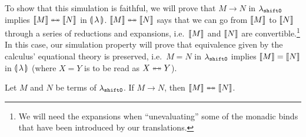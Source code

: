 To show that this simulation is faithful, we will prove that $M \to N$ in
$\lambda_{\shifto}$ implies $\sem{M} \ttoffrom \sem{N}$ in
$\banana{\lambda}$. $\sem{M} \ttoffrom \sem{N}$ says that we can go from
$\sem{M}$ to $\sem{N}$ through a series of reductions and expansions, i.e.\
$\sem{M}$ and $\sem{N}$ are convertible.\footnote{We will need the
  expansions when ``unevaluating'' some of the monadic binds that have been
  introduced by our translations.} In this case, our simulation property
will prove that equivalence given by the calculus' equational theory is
preserved,
i.e.\ $M = N$ in $\lambda_\shifto$ implies $\sem{M} = \sem{N}$ in
$\banana{\lambda}$ (where $X = Y$ is to be read as $X \ttoffrom Y$).

\begin{property}
  Let $M$ and $N$ be terms of $\lambda_\shifto$. If $M \to N$, then
  $\sem{M} \ttoffrom \sem{N}$.
\end{property}

